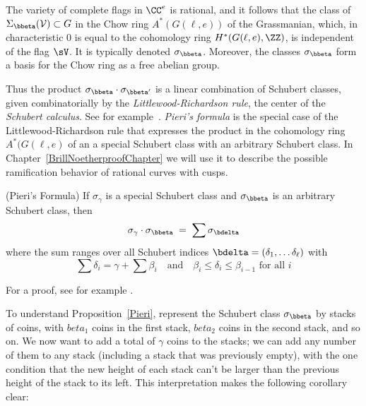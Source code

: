 \begin{fact}
The variety of complete flags in $\CC^e$ is rational, and it follows that the class of $\Sigma_{\bbeta}({\cal V})\subset G$
in the Chow ring $A^*(G(\ell, e))$ of the Grassmanian, which, in characteristic 0 is equal to the cohomology ring $H^*(G(\ell, e), \ZZ)$,  is independent
of the flag $\sV$. It is typically denoted $\sigma_{\bbeta}$. Moreover, the classes $\sigma_{\bbeta}$ form a basis for the Chow ring as a free abelian group.
\end{fact}

Thus the product $\sigma_{\bbeta} \cdot \sigma_{\bbeta'}$ is a linear combination of Schubert classes,
given combinatorially by the \emph{Littlewood-Richardson rule}, the center of the \emph{Schubert calculus}. See for example~\cite{MR2247964}.
\emph{Pieri's formula} is the special
case of the Littlewood-Richardson rule that expresses the product in the cohomology ring $A^*(G(\ell, e)$ of an a special Schubert class with an arbitrary Schubert class.
In Chapter~\ref{BrillNoetherproofChapter} we will use it to describe the possible ramification behavior of rational curves with cusps.

\begin{fact}
\begin{proposition}\label{Pieri}(Pieri's Formula)
If $\sigma_\gamma$ is a special Schubert class and $\sigma_{\bbeta}$ is an arbitrary Schubert class, then
$$
\sigma_\gamma \cdot \sigma_{\bbeta} \; = \; \sum \sigma_{\bdelta}
$$
where the sum ranges over all Schubert indices ${\bdelta} = (\delta_1, \dots \delta_{\ell})$ with
$$
\sum \delta_i = \gamma + \sum \beta_i \quad \text{and} \quad \beta_i \leq \delta_i \leq \beta_{i-1} \text{ for all } i
$$
\end{proposition}
For a proof, see for example \cite[Section 4.2.4]{3264}.
\end{fact}

To understand Proposition~\ref{Pieri}, represent the Schubert class $\sigma_{\bbeta}$ by stacks of coins, with $beta_1$ coins in the first stack, $beta_2$ coins in the second stack, and so on. We now want to add a total of $\gamma$ coins to the stacks; we can add any number of them to any stack (including a stack that was previously empty), with the one condition that the new height of each stack can't be larger than the previous height of the stack to its left. This interpretation makes the following corollary clear:

